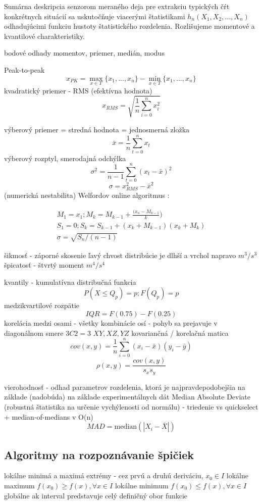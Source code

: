 Sumárna deskripcia senzorom meraného deja pre extrakciu typických čŕt konkrétnych situácií sa uskutočňuje viacerými štatistikami
$h_n(X_1, X_2, ..., X_n)$ odhadujúcimi funkciu hustoty štatistického rozdelenia. Rozlišujeme momentové a kvantilové charakteristiky.

bodové odhady momentov,
priemer, medián, modus

Peak-to-peak 
	$$x_{PK} = \max_{x \in T}\{x_1, ..., x_n\} - \min_{x \in T}\{x_1, ..., x_n\}$$
kvadratický priemer - RMS (efektívna hodnota) 
	$$x_{RMS} = \sqrt{\frac{1}{n}\sum_{i=0}^{n}{x_i^2}}$$
 
výberový priemer = stredná hodnota = jednosmerná zložka
	$$ \bar{x} = \frac{1}{n} \sum_{t = 0}^{n}{x_t} $$
výberový rozptyl, smerodajná odchýlka
	$$ \sigma^2 = \frac{1}{n - 1} \sum_{t = 0}^{n}{(x_t - \bar{x})^2} $$
	$$ \sigma = x_{RMS}^2 - \bar{x}^2 $$ (numerická nestabilita)
	Welfordov online algoritmus \cite{knuth}:
\begin{ceqn}\begin{align}
   M_1 = x_1; M_k = M_{k-1} + \frac{(x_n - M_{k-1}}{k}) \\
   S_1 = 0; S_k = S_{k-1} + (x_k + M_{k-1})(x_k + M_k)  \\
   \sigma = \sqrt{S_n / (n - 1)}
\end{align}\end{ceqn}

šikmosť - záporné skosenie ľavý chvost distribúcie je dlhší a vrchol napravo $m^3 / s^3$
špicatosť - štvrtý moment $m^4 / s^4$

kvantily - kumulatívna distribučná funkcia 
	$$ P(X \leq Q_p) = p; F(Q_p) = p $$
medzikvartilové rozpätie
	$$ IQR = F(0.75) - F(0.25) $$
korelácia medzi osami - všetky kombinácie osí - pohyb sa prejavuje v diagonálnom smere $3C2 = 3$ $XY, XZ, YZ$ kovariančná / korelačná matica
$$cov(x, y) = \frac{1}{n} \sum_{i=0}^{n}{(x_i - \bar{x})(y_i - \bar{y})} $$
$$\rho(x, y) = \frac{cov(x, y)}{s_x s_y} $$

vierohodnosť - odhad parametrov rozdelenia, ktorá je najpravdepodobejšia na základe (nadobúda) na základe experimentálnych dát 
Median Absolute Deviate (robustná štatistika na určenie vychýlenosti od normálu) - triedenie vs quickselect + median-of-medians v O(n)
\begin{equation}
MAD = \mathrm{median}(|X_i - \bar{X}|)
\end{equation}

\subsection{Algoritmy na rozpoznávanie špičiek}
\label{peak-detection}
lokálne minimá a maximá extrémy - cez prvú a druhú deriváciu, 
\cite{survey-peaks-valleys}
$x_0 \in I$
lokálne maximum $f(x_0) \geq f(x), \forall x \in I$ 
lokálne minimum  $f(x_0) \leq f(x), \forall x \in I$
globálne ak interval predstavuje celý definičný obor funkcie

